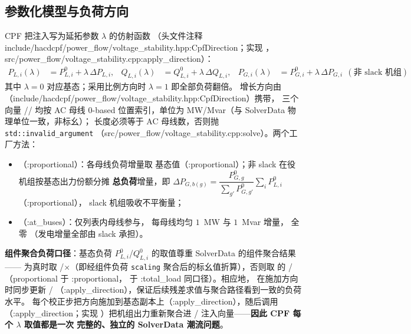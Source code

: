\subsection{参数化模型与负荷方向}
CPF 把注入写为延拓参数 $\lambda$ 的仿射函数
（头文件注释 include/hacdcpf/power\_flow/voltage\_stability.hpp:CpfDirection；实现
，src/power\_flow/voltage\_stability.cpp:apply\_direction）：
\begin{align*}
P_{L,i}(\lambda)&=P_{L,i}^{0}+\lambda\,\Delta P_{L,i},&
Q_{L,i}(\lambda)&=Q_{L,i}^{0}+\lambda\,\Delta Q_{L,i},&
P_{G,i}(\lambda)&=P_{G,i}^{0}+\lambda\,\Delta P_{G,i}\ \ (\text{非 slack 机组})
\end{align*}
其中 $\lambda=0$ 对应基态；采用比例方向时 $\lambda=1$ 即全部负荷翻倍。
增长方向由 （include/hacdcpf/power\_flow/voltage\_stability.hpp:CpfDirection）携带，
三个向量 // 均按 AC 母线 0-based
位置索引，单位为 MW/Mvar（与 SolverData 物理单位一致，非标幺）；
长度必须等于 AC 母线数，否则抛 \texttt{std::invalid\_argument}
（src/power\_flow/voltage\_stability.cpp:solve）。两个工厂方法：
\begin{itemize}
  \item {}（:proportional）：各母线负荷增量取
        基态值（:proportional）；非 slack 在役机组按基态出力份额分摊
        \textbf{总负荷}增量，即
        $\Delta P_{G,b(g)}=\dfrac{P_{G,g}^{0}}{\sum_{g'}P_{G,g'}^{0}}\sum_i P_{L,i}^{0}$
        （:proportional）， slack 机组吸收不平衡量；
  \item {}（:at\_buses）：仅列表内母线参与，
        每母线均匀 $1$~MW 与 $1$~Mvar 增量， 全零
        （发电增量全部由 slack 承担）。
\end{itemize}
\textbf{组件聚合负荷口径}：基态负荷 $P_{L,i}^{0}$/$Q_{L,i}^{0}$ 的取值尊重
SolverData 的组件聚合结果—— 为真时取
/$\times$（即经组件负荷
\texttt{scaling} 聚合后的标幺值折算），否则取  的
/（proportional 于 :proportional，
 于 :total\_load 同口径）。相应地，
 在施加方向时同步更新 /
（:apply\_direction），保证后续残差求值与聚合路径看到一致的负荷水平。
每个校正步把方向施加到基态副本上（:apply\_direction），随后调用
（:apply\_direction；实现
）把机组出力重新聚合进
/ 注入向量——\textbf{因此 CPF 每个 $\lambda$ 取值都是一次
完整的、独立的 SolverData 潮流问题}。

